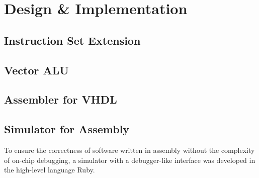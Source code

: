 \section{Design \& Implementation}
\subsection{Instruction Set Extension}
\subsection{Vector ALU}
\subsection{Assembler for VHDL}
\subsection{Simulator for Assembly}
To ensure the correctness of software written in assembly without the
complexity of on-chip debugging, a simulator with a debugger-like interface was
developed in the high-level language Ruby.


